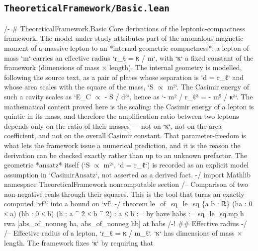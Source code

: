 \documentclass[11pt,a4paper]{article}
\begin{document}
\subsection*{\texttt{TheoreticalFramework/Basic.lean}}
\vspace{2pt}
{\ttfamily\scriptsize\setlength{\parindent}{0pt}\setlength{\baselineskip}{7.6pt}\setlength{\parskip}{0pt}\raggedright\obeyspaces\obeylines
/-
\# TheoreticalFramework.Basic
\mbox{}
Core derivations of the leptonic-compactness framework.
\mbox{}
The model under study attributes part of the anomalous magnetic moment of a
massive lepton to an *internal geometric compactness*: a lepton of mass `m`
carries an effective radius
\mbox{}
  `r\_\allowbreak{}ℓ = κ / m`,
\mbox{}
with `κ` a fixed constant of the framework (dimensions of mass × length).  The
internal geometry is modelled, following the source text, as a pair of plates
whose separation is `d = r\_\allowbreak{}ℓ` and whose area scales with the square of the mass,
`S $\propto$ m²`.  The Casimir energy of such a cavity scales as
\mbox{}
  `E\_\allowbreak{}C $\propto$ - S / d³`,
\mbox{}
hence as `- m² / r\_\allowbreak{}ℓ³ = - m⁵ / κ³`.
\mbox{}
The mathematical content proved here is the scaling: the Casimir energy of a
lepton is quintic in its mass, and therefore the amplification ratio between two
leptons depends only on the ratio of their masses — not on `κ`, not on the area
coefficient, and not on the overall Casimir constant.  That parameter-freedom is
what lets the framework issue a numerical prediction, and it is the reason the
derivation can be checked exactly rather than up to an unknown prefactor.
\mbox{}
The geometric *ansatz* itself (`S $\propto$ m²`, `d = r\_\allowbreak{}ℓ`) is recorded as an explicit
model assumption in `CasimirAnsatz`, not asserted as a derived fact.
-/
import Mathlib
\mbox{}
namespace TheoreticalFramework
\mbox{}
noncomputable section
\mbox{}
/-- Comparison of two non-negative reals through their squares.  This is the
tool that turns an exactly computed `vf²` into a bound on `vf`. -/
theorem le\_\allowbreak{}of\_\allowbreak{}sq\_\allowbreak{}le\_\allowbreak{}sq \{a b : ℝ\} (ha : 0 ≤ a) (hb : 0 ≤ b) (h : a \textasciicircum{} 2 ≤ b \textasciicircum{} 2) : a ≤ b := by
  have habs := sq\_\allowbreak{}le\_\allowbreak{}sq.mp h
  rwa [abs\_\allowbreak{}of\_\allowbreak{}nonneg ha, abs\_\allowbreak{}of\_\allowbreak{}nonneg hb] at habs
\mbox{}
/-! \#\# Effective radius -/
\mbox{}
/-- Effective radius of a lepton, `r\_\allowbreak{}ℓ = κ / m\_\allowbreak{}ℓ`.
\mbox{}
`κ` has dimensions of mass × length.  The framework fixes `κ` by requiring that
}
\end{document}
